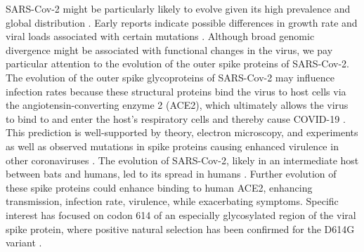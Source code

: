 \documentclass[9pt,twocolumn,twoside,lineno]{pnas-new}
\begin{document}
SARS-Cov-2 might be particularly likely to evolve given its high prevalence and global distribution \cite{Korber2020-ub}. Early reports indicate possible differences in growth rate and viral loads associated with certain mutations \cite{Korber2020-qd}. Although broad genomic divergence might be associated with functional changes in the virus, we pay particular attention to the evolution of the outer spike proteins of SARS-Cov-2. The evolution of the outer spike glycoproteins of SARS-Cov-2 may influence infection rates because these structural proteins bind the virus to host cells via the angiotensin-converting enzyme 2 (ACE2), which ultimately allows the virus to bind to and enter the host’s respiratory cells and thereby cause COVID-19 \cite{Liu2020-oe}. This prediction is well-supported by theory, electron microscopy, and experiments \cite{Brufsky2020-im,Daniel2020-hf, Alexandra_C2020-ca} as well as observed mutations in spike proteins causing enhanced virulence in other coronaviruses \cite{Krueger2001-aq}. The evolution of SARS-Cov-2, likely in an intermediate host between bats and humans, led to its spread in humans \cite{Shereen2020-zb}. Further evolution of these spike proteins could enhance binding to human ACE2, enhancing transmission, infection rate, virulence, while exacerbating symptoms. Specific interest has focused on codon 614 of an especially glycosylated region of the viral spike protein, where positive natural selection has been confirmed for the D614G variant \cite{Brufsky2020-im, Korber2020-ub, Zhan2020-za}.
\end{document}
